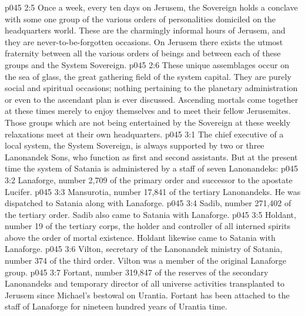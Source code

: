 \vs p045 2:5 Once a week, every ten days on Jerusem, the Sovereign holds a conclave with some one group of the various orders of personalities domiciled on the headquarters world. These are the charmingly informal hours of Jerusem, and they are never\hyp{}to\hyp{}be\hyp{}forgotten occasions. On Jerusem there exists the utmost fraternity between all the various orders of beings and between each of these groups and the System Sovereign.
\vs p045 2:6 These unique assemblages occur on the sea of glass, the great gathering field of the system capital. They are purely social and spiritual occasions; nothing pertaining to the planetary administration or even to the ascendant plan is ever discussed. Ascending mortals come together at these times merely to enjoy themselves and to meet their fellow Jerusemites. Those groups which are not being entertained by the Sovereign at these weekly relaxations meet at their own headquarters.
\vs p045 3:1 The chief executive of a local system, the System Sovereign, is always supported by two or three Lanonandek Sons, who function as first and second assistants. But at the present time the system of Satania is administered by a staff of seven Lanonandeks:
\pc \vs p045 3:2 \bibnobreakspace {}Lanaforge, number 2,709 of the primary order and successor to the apostate Lucifer.
\pc \vs p045 3:3 \bibnobreakspace {}Man\-su\-ro\-tia, number 17,841 of the tertiary Lanonandeks. He was dispatched to Satania along with Lanaforge.
\pc \vs p045 3:4 \bibnobreakspace {}Sadib, number 271,402 of the tertiary order. Sadib also came to Satania with Lanaforge.
\pc \vs p045 3:5 \bibnobreakspace {}Holdant, number 19 of the tertiary corps, the holder and controller of all interned spirits above the order of mortal existence. Holdant likewise came to Satania with Lanaforge.
\pc \vs p045 3:6 \bibnobreakspace {}Vilton, secretary of the Lanonandek ministry of Satania, number 374 of the third order. Vilton was a member of the original Lanaforge group.
\pc \vs p045 3:7 \bibnobreakspace {}Fortant, number 319,847 of the reserves of the secondary Lanonandeks and temporary director of all universe activities transplanted to Jerusem since Michael’s bestowal on Urantia. Fortant has been attached to the staff of Lanaforge for nineteen hundred years of Urantia time.\plusone
